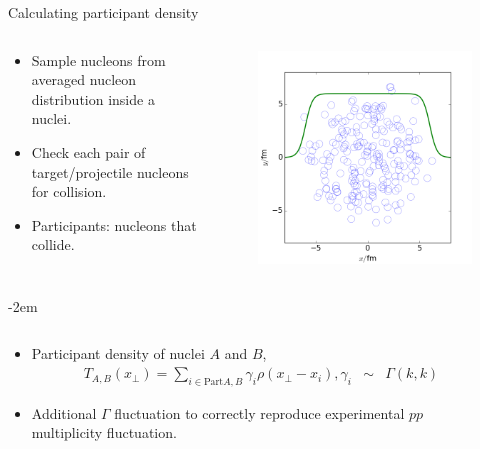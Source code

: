 \documentclass[11pt]{beamer}
\begin{document}
\begin{frame}{Calculating participant density}
\begin{columns}
\begin{column}{0.7\textwidth}
\begin{itemize}
\item Sample nucleons from averaged nucleon distribution inside a nuclei.
\item Check each pair of target/projectile nucleons for collision.
\item Participants: nucleons that collide.
\end{itemize}
\end{column}
\begin{column}{0.3\textwidth}
\begin{figure}
\begin{center}
\includegraphics[width = \textwidth]{./pics/WS2.png}
\end{center}
\end{figure}
\end{column}
\end{columns}
\kern-2em
\begin{columns}
\begin{column}{\textwidth}
\begin{itemize}
\item Participant density of nuclei $A$ and $B$,
\begin{eqnarray}
\nonumber
	T_{A,B}(x_\perp) = \sum_{i \in \textrm{Part} A,B} \gamma_i \rho(x_\perp- x_i), \gamma_i &\sim& \Gamma(k, k)
\end{eqnarray}
\item Additional $\Gamma$ fluctuation to correctly reproduce experimental $pp$ multiplicity fluctuation.
\end{itemize}
\end{column}
\begin{column}{0.0\textwidth}
\end{column}
\end{columns}
\end{frame}
\end{document}
